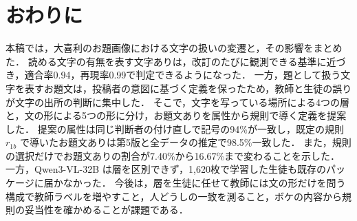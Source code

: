 \section{おわりに}
\label{sec_conclusion}
本稿では，大喜利のお題画像における文字の扱いの変遷と，その影響をまとめた．
読める文字の有無を表す文字ありは，改訂のたびに観測できる基準に近づき，適合率0.94，再現率0.99で判定できるようになった．
一方，題として扱う文字を表すお題文は，投稿者の意図に基づく定義を保ったため，教師と生徒の誤りが文字の出所の判断に集中した．
そこで，文字を写っている場所による4つの層と，文の形による5つの形に分け，お題文ありを属性から規則で導く定義を提案した．
提案の属性は同じ判断者の付け直しで記号の94\%が一致し，既定の規則 $ r_{1b} $ で導いたお題文ありは第5版と全データの推定で98.5\%一致した．
また，規則の選択だけでお題文ありの割合が7.40\%から16.67\%まで変わることを示した．
一方，Qwen3-VL-32B は層を区別できず，1,620枚で学習した生徒も既存のパッケージに届かなかった．
今後は，層を生徒に任せて教師には文の形だけを問う構成で教師ラベルを増やすこと，人どうしの一致を測ること，ボケの内容から規則の妥当性を確かめることが課題である．
